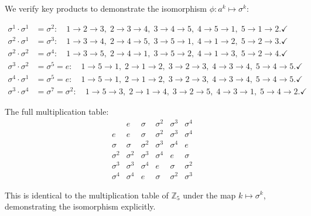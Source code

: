 \documentclass[12pt]{article}
\begin{document}
We verify key products to demonstrate the isomorphism $\phi: a^k \mapsto \sigma^k$:

\begin{align*}
\sigma^1 \cdot \sigma^1 &= \sigma^2: \quad 1 \to 2 \to 3, \; 2 \to 3 \to 4, \; 3 \to 4 \to 5, \; 4 \to 5 \to 1, \; 5 \to 1 \to 2. \checkmark \\
\sigma^2 \cdot \sigma^1 &= \sigma^3: \quad 1 \to 3 \to 4, \; 2 \to 4 \to 5, \; 3 \to 5 \to 1, \; 4 \to 1 \to 2, \; 5 \to 2 \to 3. \checkmark \\
\sigma^2 \cdot \sigma^2 &= \sigma^4: \quad 1 \to 3 \to 5, \; 2 \to 4 \to 1, \; 3 \to 5 \to 2, \; 4 \to 1 \to 3, \; 5 \to 2 \to 4. \checkmark \\
\sigma^3 \cdot \sigma^2 &= \sigma^5 = e: \quad 1 \to 5 \to 1, \; 2 \to 1 \to 2, \; 3 \to 2 \to 3, \; 4 \to 3 \to 4, \; 5 \to 4 \to 5. \checkmark \\
\sigma^4 \cdot \sigma^1 &= \sigma^5 = e: \quad 1 \to 5 \to 1, \; 2 \to 1 \to 2, \; 3 \to 2 \to 3, \; 4 \to 3 \to 4, \; 5 \to 4 \to 5. \checkmark \\
\sigma^3 \cdot \sigma^4 &= \sigma^7 = \sigma^2: \quad 1 \to 5 \to 3, \; 2 \to 1 \to 4, \; 3 \to 2 \to 5, \; 4 \to 3 \to 1, \; 5 \to 4 \to 2. \checkmark
\end{align*}

The full multiplication table:
\[
\begin{array}{c|ccccc}
 & e & \sigma & \sigma^2 & \sigma^3 & \sigma^4 \\
\hline
e & e & \sigma & \sigma^2 & \sigma^3 & \sigma^4 \\
\sigma & \sigma & \sigma^2 & \sigma^3 & \sigma^4 & e \\
\sigma^2 & \sigma^2 & \sigma^3 & \sigma^4 & e & \sigma \\
\sigma^3 & \sigma^3 & \sigma^4 & e & \sigma & \sigma^2 \\
\sigma^4 & \sigma^4 & e & \sigma & \sigma^2 & \sigma^3
\end{array}
\]

This is identical to the multiplication table of $\mathbb{Z}_5$ under the map $k \mapsto \sigma^k$, demonstrating the isomorphism explicitly.
\end{document}
